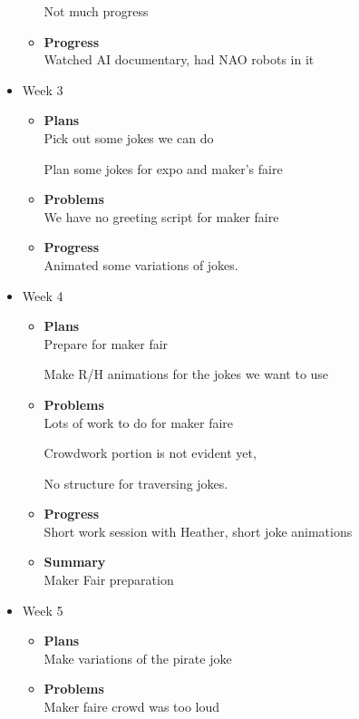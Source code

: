 \begin{itemize}
\begin{itemize}
Not much progress
			\item \textbf{Progress} \\
			Watched AI documentary, had NAO robots in it

		\end{itemize}
		\item{Week 3}
		\begin{itemize}
			\item \textbf{Plans} \\
			Pick out some jokes we can do

Plan some jokes for expo and maker's faire
			\item \textbf{Problems} \\
			We have no greeting script for maker faire
			\item \textbf{Progress} \\
			Animated some variations of jokes.
		\end{itemize}
		\item{Week 4}
		\begin{itemize}
			\item \textbf{Plans} \\
			Prepare for maker fair

Make R/H animations for the jokes we want to use
			\item \textbf{Problems} \\
			Lots of work to do for maker faire

Crowdwork portion is not evident yet,

No structure for traversing jokes.
			\item \textbf{Progress} \\
			Short work session with Heather, short joke animations
			\item \textbf{Summary} \\
			Maker Fair preparation
		\end{itemize}
		\item{Week 5}
		\begin{itemize}
			\item \textbf{Plans} \\
			Make variations of the pirate joke
			\item \textbf{Problems} \\
			Maker faire crowd was too loud


\end{itemize}
\end{itemize}
